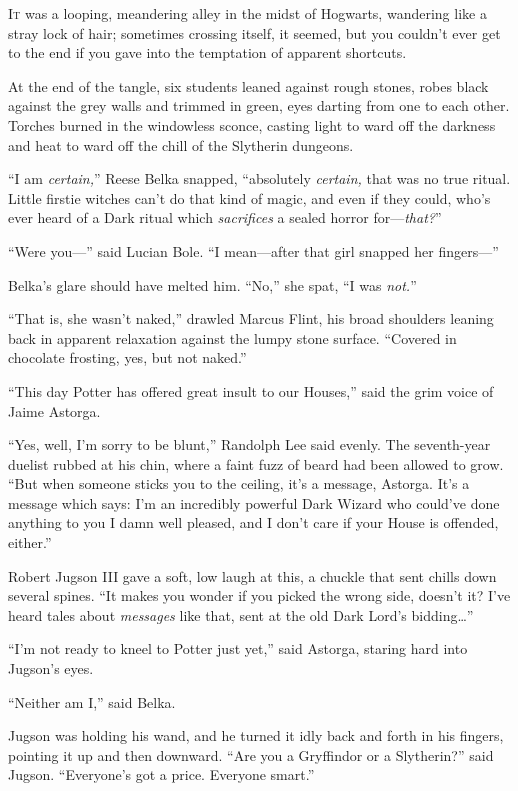 
\lettrine{I}{t} was a looping,
meandering alley in the midst of Hogwarts, wandering like a stray lock of hair; sometimes crossing itself, it seemed, but you couldn’t ever get to the end if you gave into the temptation of apparent shortcuts.

At the end of the tangle, six students leaned against rough stones, robes black against the grey walls and trimmed in green, eyes darting from one to each other. Torches burned in the windowless sconce, casting light to ward off the darkness and heat to ward off the chill of the Slytherin dungeons.

“I am \emph{certain,}” Reese Belka snapped, “absolutely \emph{certain,} that was no true ritual. Little firstie witches can’t do that kind of magic, and even if they could, who’s ever heard of a Dark ritual which \emph{sacrifices} a sealed horror for—\emph{that?}”

“Were you—” said Lucian Bole. “I mean—after that girl snapped her fingers—”

Belka’s glare should have melted him. “No,” she spat, “I was \emph{not.}”

“That is, she wasn’t naked,” drawled Marcus Flint, his broad shoulders leaning back in apparent relaxation against the lumpy stone surface. “Covered in chocolate frosting, yes, but not naked.”

“This day Potter has offered great insult to our Houses,” said the grim voice of Jaime Astorga.

“Yes, well, I’m sorry to be blunt,” Randolph Lee said evenly. The seventh-year duelist rubbed at his chin, where a faint fuzz of beard had been allowed to grow. “But when someone sticks you to the ceiling, it’s a message, Astorga. It’s a message which says: I’m an incredibly powerful Dark Wizard who could’ve done anything to you I damn well pleased, and I don’t care if your House is offended, either.”

Robert Jugson III gave a soft, low laugh at this, a chuckle that sent chills down several spines. “It makes you wonder if you picked the wrong side, doesn’t it? I’ve heard tales about \emph{messages} like that, sent at the old Dark Lord’s bidding…”

“I’m not ready to kneel to Potter just yet,” said Astorga, staring hard into Jugson’s eyes.

“Neither am I,” said Belka.

Jugson was holding his wand, and he turned it idly back and forth in his fingers, pointing it up and then downward. “Are you a Gryffindor or a Slytherin?” said Jugson. “Everyone’s got a price. Everyone smart.”

